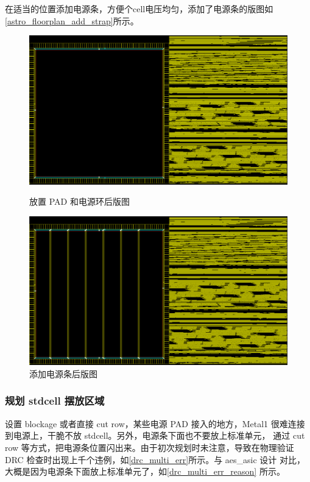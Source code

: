 \documentclass[12pt,hyperref,a4paper,UTF8]{ctexart}
\begin{document}
在适当的位置添加电源条，方便个cell电压均匀，添加了电源条的版图如\autoref{astro_floorplan_add_strap}所示。
\begin{figure}[htbp]
    \centering
    \begin{minipage}{0.45\textwidth}
        \centering
        \includegraphics[width =1\textwidth]{figures/astro_floorplan.png}
        \caption{放置 PAD 和电源环后版图}
        \label{astro_floorplan}
    \end{minipage}
    \begin{minipage}{0.45\textwidth}
        \centering
        \includegraphics[width =1\textwidth]{figures/astro_floorplan_add_strap.png}
        \caption{添加电源条后版图}
        \label{astro_floorplan_add_strap}
    \end{minipage}
\end{figure}

\subsubsection{规划 stdcell 摆放区域}
设置 blockage 或者直接 cut row，某些电源 PAD 接入的地方，Metal1 很难连接
到电源上，干脆不放 stdcell。另外，电源条下面也不要放上标准单元，
通过 cut row 等方式，把电源条位置闪出来。由于初次规划时未注意，导致在物理验证
 DRC 检查时出现上千个违例，如\autoref{drc_multi_err}所示。与 aes\_asic 设计
对比，大概是因为电源条下面放上标准单元了，如\autoref{drc_multi_err_reason}
所示。
\end{document}
